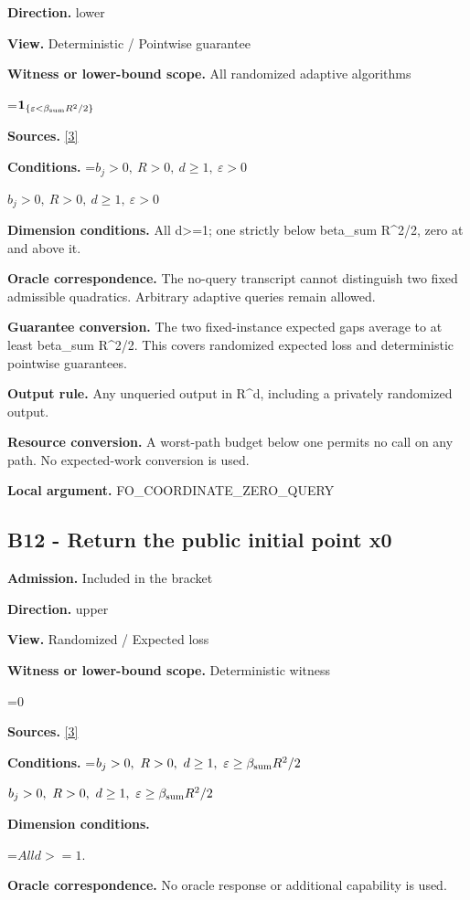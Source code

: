 \documentclass[10pt,a4paper]{article}
\newcommand{\AtlasMath}[1]{\par\begingroup\centering\setbox0=\hbox{$\displaystyle #1$}\ifdim\wd0>1.4\linewidth\typeout{ATLAS WIDE FORMULA: \the\wd0}\fi\ifdim\wd0>\linewidth\resizebox{\linewidth}{!}{\box0}\else\box0\fi\par\endgroup}
\newcommand{\AtlasInlineMath}[1]{\begingroup\setbox0=\hbox{$#1$}\ifdim\wd0>.4\linewidth\endgroup\AtlasMath{#1}\else\endgroup$#1$\fi}
\begin{document}
\textbf{Direction.} lower

\textbf{View.} Deterministic / Pointwise guarantee

\textbf{Witness or lower-bound scope.} All randomized adaptive algorithms

\AtlasMath{\mathbf{1}_{\{\varepsilon<\beta_{\rm sum}R^2/2\}}}
\textbf{Sources.} \href{https://arxiv.org/pdf/1405.4980}{[3]}

\textbf{Conditions.} \AtlasInlineMath{b_j>0,\ R>0,\ d\ge1,\ \varepsilon>0}

\textbf{Dimension conditions.} All d>=1; one strictly below beta\_\allowbreak{}sum R\textasciicircum{}2/2, zero at and above it.

\textbf{Oracle correspondence.} The no-query transcript cannot distinguish two fixed admissible quadratics. Arbitrary adaptive queries remain allowed.

\textbf{Guarantee conversion.} The two fixed-instance expected gaps average to at least beta\_\allowbreak{}sum R\textasciicircum{}2/2. This covers randomized expected loss and deterministic pointwise guarantees.

\textbf{Output rule.} Any unqueried output in R\textasciicircum{}d, including a privately randomized output.

\textbf{Resource conversion.} A worst-path budget below one permits no call on any path. No expected-work conversion is used.

\textbf{Local argument.} FO\_\allowbreak{}COORDINATE\_\allowbreak{}ZERO\_\allowbreak{}QUERY

\subsection{B12 - Return the public initial point x0}
\textbf{Admission.} Included in the bracket

\textbf{Direction.} upper

\textbf{View.} Randomized / Expected loss

\textbf{Witness or lower-bound scope.} Deterministic witness

\AtlasMath{0}
\textbf{Sources.} \href{https://arxiv.org/pdf/1405.4980}{[3]}

\textbf{Conditions.} \AtlasInlineMath{b_j>0,\ R>0,\ d\ge1,\ \varepsilon\ge\beta_{\rm sum}R^2/2}

\textbf{Dimension conditions.}

\AtlasMath{All d>=1.}
\textbf{Oracle correspondence.} No oracle response or additional capability is used.
\end{document}

